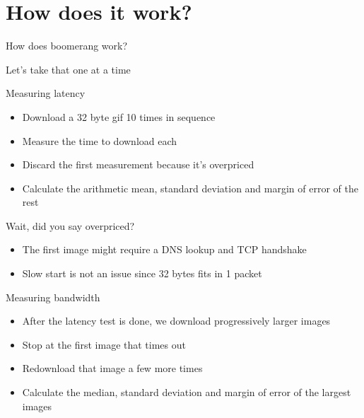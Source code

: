 \documentclass{beamer}
\begin{document}
\section{How does it work?}
\label{sec:internals}

\begin{frame}{}
  \begin{center}
  How does boomerang work?
  \end{center}
\end{frame}

\begin{frame}{}
  \begin{center}
  Let's take that one at a time
  \end{center}
\end{frame}

\begin{frame}{Measuring latency}
  \begin{itemize}
  \item Download a 32 byte gif 10 times in sequence
  \item Measure the time to download each
  \item Discard the first measurement because it's overpriced
  \item Calculate the arithmetic mean, standard deviation and margin of error of the rest
  \end{itemize}
\end{frame}

\begin{frame}{Wait, did you say overpriced?}
  \begin{itemize}
  \item The first image might require a DNS lookup and TCP handshake
  \item Slow start is not an issue since 32 bytes fits in 1 packet
  \end{itemize}
\end{frame}

\begin{frame}{Measuring bandwidth}
  \begin{itemize}
  \item After the latency test is done, we download progressively larger images
  \item Stop at the first image that times out
  \item Redownload that image a few more times
  \item Calculate the median, standard deviation and margin of error of the largest images
  \end{itemize}
\end{frame}
\end{document}
